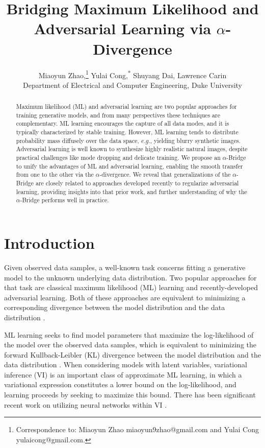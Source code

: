 \documentclass[letterpaper]{article} %
\title{Bridging Maximum Likelihood and Adversarial Learning via $\alpha$-Divergence}
\author{
	Miaoyun Zhao,\thanks{Correspondence to: Miaoyun Zhao {miaoyun9zhao@gmail.com} and Yulai Cong {yulaicong@gmail.com}.}
	Yulai Cong,\textsuperscript{*}
	Shuyang Dai, 
	Lawrence Carin
	\\ 
	Department of Electrical and Computer Engineering, Duke University\\
}
\begin{document}
\maketitle

\begin{abstract}

Maximum likelihood (ML) and adversarial learning are two popular approaches for training generative models, and from many perspectives these techniques are complementary. ML learning encourages the capture of all data modes, and it is typically characterized by stable training. However, ML learning tends to distribute probability mass diffusely over the data space, $e.g.$, yielding blurry synthetic images. Adversarial learning is well known to synthesize highly realistic natural images, despite practical challenges like mode dropping and delicate training. We propose an $\alpha$-Bridge to unify the advantages of ML and adversarial learning, enabling the smooth transfer from one to the other via the $\alpha$-divergence. We reveal that generalizations of the $\alpha$-Bridge are closely related to approaches developed recently to regularize adversarial learning,  providing insights into that prior work, and further understanding of why the $\alpha$-Bridge performs well in practice.

\end{abstract}



\section{Introduction}
\label{sec:Intro}


Given observed data samples, a well-known task concerns fitting a generative model to the unknown underlying data distribution. Two popular approaches for that task are classical maximum likelihood (ML) learning and recently-developed adversarial learning. Both of these approaches are equivalent to minimizing a corresponding divergence between the model distribution and the data distribution \cite{bishop_2006_PRML,goodfellow2014generative}. 


ML learning seeks to find model parameters that maximize the log-likelihood of the model over the observed data samples, which is equivalent to minimizing the forward Kullback-Leibler (KL) divergence between the model distribution and the data distribution \cite{mclachlan2007algorithm}. 
When considering models with latent variables, variational inference (VI) \cite{jordan1999introduction,blei2006variational} is an important class of approximate ML learning, in which a variational expression constitutes a lower bound on the log-likelihood, and learning proceeds by seeking to maximize this bound. 
There has been significant recent work on utilizing neural networks within VI \cite{kingma2014auto,dai2018diagnosing}.
\end{document}
